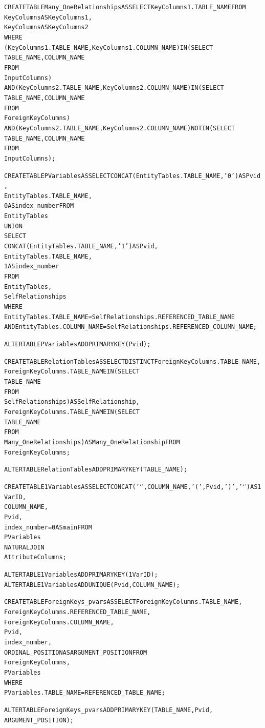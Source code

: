 \documentclass{acm_proc_article-sp}
\begin{document}
\begin{appendix}
\begin{scriptsize}
\begin{alltt}
CREATE TABLE Many_OneRelationships AS SELECT KeyColumns1.TABLE_NAME FROM
KeyColumns AS KeyColumns1,
KeyColumns AS KeyColumns2
WHERE
(KeyColumns1.TABLE_NAME , KeyColumns1.COLUMN_NAME) IN (SELECT 
        TABLE_NAME, COLUMN_NAME
    FROM
        InputColumns)
    AND (KeyColumns2.TABLE_NAME , KeyColumns2.COLUMN_NAME) IN (SELECT 
        TABLE_NAME, COLUMN_NAME
    FROM
        ForeignKeyColumns)
    AND (KeyColumns2.TABLE_NAME , KeyColumns2.COLUMN_NAME) NOT IN (SELECT 
        TABLE_NAME, COLUMN_NAME
    FROM
        InputColumns);

CREATE TABLE PVariables AS SELECT CONCAT(EntityTables.TABLE_NAME, '0') AS Pvid,
EntityTables.TABLE_NAME,
0 AS index_number FROM
EntityTables 
UNION 
SELECT 
CONCAT(EntityTables.TABLE_NAME, '1') AS Pvid,
EntityTables.TABLE_NAME,
1 AS index_number
FROM
EntityTables,
SelfRelationships
WHERE
EntityTables.TABLE_NAME = SelfRelationships.REFERENCED_TABLE_NAME
    AND EntityTables.COLUMN_NAME = SelfRelationships.REFERENCED_COLUMN_NAME ;

ALTER TABLE PVariables ADD PRIMARY KEY (Pvid);

CREATE TABLE RelationTables AS SELECT DISTINCT ForeignKeyColumns.TABLE_NAME,
ForeignKeyColumns.TABLE_NAME IN (SELECT 
        TABLE_NAME
    FROM
        SelfRelationships) AS SelfRelationship,
ForeignKeyColumns.TABLE_NAME IN (SELECT 
        TABLE_NAME
    FROM
        Many_OneRelationships) AS Many_OneRelationship FROM
ForeignKeyColumns;

ALTER TABLE RelationTables ADD PRIMARY KEY (TABLE_NAME);

CREATE TABLE 1Variables AS SELECT CONCAT('`', COLUMN_NAME, '(', Pvid, ')', '`') AS 1VarID,
COLUMN_NAME,
Pvid,
index_number = 0 AS main FROM
PVariables
    NATURAL JOIN
AttributeColumns;

ALTER TABLE 1Variables ADD PRIMARY KEY (1VarID);
ALTER TABLE 1Variables ADD UNIQUE(Pvid,COLUMN_NAME);

CREATE TABLE ForeignKeys_pvars AS SELECT ForeignKeyColumns.TABLE_NAME,
ForeignKeyColumns.REFERENCED_TABLE_NAME,
ForeignKeyColumns.COLUMN_NAME,
Pvid,
index_number,
ORDINAL_POSITION AS ARGUMENT_POSITION FROM
ForeignKeyColumns,
PVariables
WHERE
PVariables.TABLE_NAME = REFERENCED_TABLE_NAME;

ALTER TABLE ForeignKeys_pvars ADD PRIMARY KEY (TABLE_NAME,Pvid,
ARGUMENT_POSITION);


\end{alltt}
\end{scriptsize}
\end{appendix}
\end{document}
